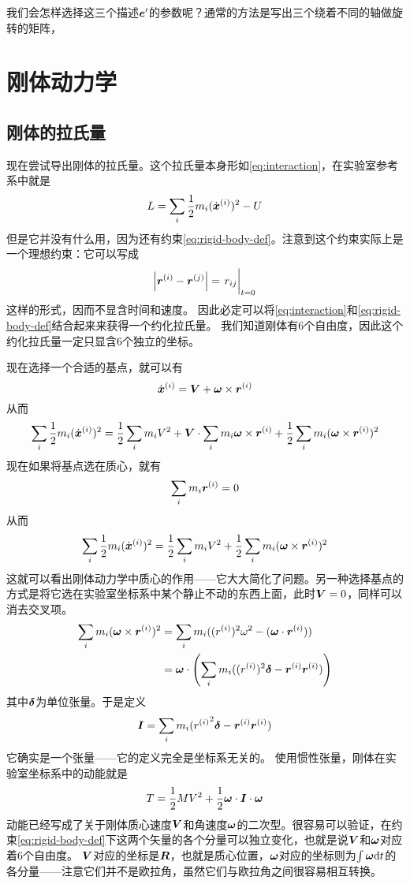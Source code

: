 我们会怎样选择这三个描述$\vb*{e}'$的参数呢？通常的方法是写出三个绕着不同的轴做旋转的矩阵，

\section{刚体动力学}

\subsection{刚体的拉氏量}

现在尝试导出刚体的拉氏量。这个拉氏量本身形如\eqref{eq:interaction}，在实验室参考系中就是
\[
    L = \sum_i \frac{1}{2} m_i (\dot{\vb*{x}}^{(i)})^2 - U
\]
但是它并没有什么用，因为还有约束\eqref{eq:rigid-body-def}。注意到这个约束实际上是一个理想约束：它可以写成
\[
    \abs{\vb*{r}^{(i)} - \vb*{r}^{(j)}} = \eval{r_{ij}}_{t=0}
\]
这样的形式，因而不显含时间和速度。
因此必定可以将\eqref{eq:interaction}和\eqref{eq:rigid-body-def}结合起来来获得一个约化拉氏量。
我们知道刚体有6个自由度，因此这个约化拉氏量一定只显含6个独立的坐标。

现在选择一个合适的基点，就可以有
\[
    \dot{\vb*{x}}^{(i)} = \vb*{V} + \vb*{\omega} \times \vb*{r}^{(i)}
\]
从而
\[
    \sum_i \frac{1}{2} m_i (\dot{\vb*{x}}^{(i)})^2 = 
    \frac{1}{2} \sum_i m_i V^2 + \vb*{V} \cdot \sum_i m_i \vb*{\omega} \times \vb*{r}^{(i)} 
    + \frac{1}{2} \sum_i m_i (\vb*{\omega} \times \vb*{r}^{(i)})^2
\]
现在如果将基点选在质心，就有
\[
    \sum_i m_i \vb*{r}^{(i)} = 0
\]
从而
\[
    \sum_i \frac{1}{2} m_i (\dot{\vb*{x}}^{(i)})^2 = \frac{1}{2} \sum_i m_i V^2 
    + \frac{1}{2} \sum_i m_i (\vb*{\omega} \times \vb*{r}^{(i)})^2
\]
这就可以看出刚体动力学中质心的作用——它大大简化了问题。另一种选择基点的方式是将它选在实验室坐标系中某个静止不动的东西上面，此时$\vb*{V}=0$，同样可以消去交叉项。
\[
    \begin{aligned}
        \sum_i m_i (\vb*{\omega} \times \vb*{r}^{(i)})^2 
        &= \sum_i m_i ((r^{(i)})^2 \omega^2 - (\vb*{\omega} \cdot \vb*{r}^{(i)})) \\
        &= \vb*{\omega} \cdot \left( \sum_i m_i ((r^{(i)})^2 \vb*{\delta} - \vb*{r}^{(i)} \vb*{r}^{(i)} ) \right)
    \end{aligned}
\]
其中$\vb*{\delta}$为单位张量。于是定义
\begin{equation}
    \vb*{I} = \sum_i m_i {(r^{(i)}}^2 \vb*{\delta} - \vb*{r}^{(i)} \vb*{r}^{(i)} ) 
    \label{eq:ineria-tensor}
\end{equation}
它确实是一个张量——它的定义完全是坐标系无关的。
使用惯性张量，刚体在实验室坐标系中的动能就是
\begin{equation}
    T = \frac{1}{2} M V^2 + \frac{1}{2} \vb*{\omega} \cdot \vb*{I} \cdot \vb*{\omega}
    \label{eq:kinetic-energy-rigid-body}
\end{equation}
动能已经写成了关于刚体质心速度$\vb*{V}$和角速度$\vb*{\omega}$的二次型。很容易可以验证，在约束\eqref{eq:rigid-body-def}下这两个矢量的各个分量可以独立变化，也就是说$\vb*{V}$和$\vb*{\omega}$对应着6个自由度。
$\vb*{V}$对应的坐标是$\vb*{R}$，也就是质心位置，$\vb*{\omega}$对应的坐标则为$\int \vb*{\omega} \dd t$的各分量——注意它们并不是欧拉角，虽然它们与欧拉角之间很容易相互转换。

